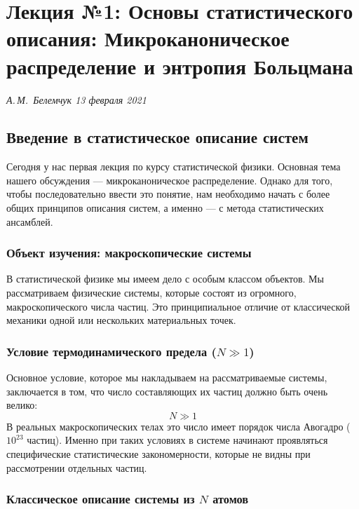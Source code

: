 \documentclass[../general/general]{subfiles}
\begin{document}
\chapter{Лекция №1: Основы статистического описания: Микроканоническое распределение и энтропия Больцмана}
\noindent\textit{А.\,М.~Белемчук \hfill 13 февраля 2021}
\vspace{1em}
\ifSubfilesClassLoaded{\tableofcontents\newpage}{}

\section{Введение в статистическое описание систем}

Сегодня у нас первая лекция по курсу статистической физики. Основная тема нашего обсуждения — микроканоническое распределение. Однако для того, чтобы последовательно ввести это понятие, нам необходимо начать с более общих принципов описания систем, а именно — с метода статистических ансамблей.

\subsection{Объект изучения: макроскопические системы}

В статистической физике мы имеем дело с особым классом объектов. Мы рассматриваем физические системы, которые состоят из огромного, макроскопического числа частиц. Это принципиальное отличие от классической механики одной или нескольких материальных точек.

\subsection{Условие термодинамического предела ($N \gg 1$)}

Основное условие, которое мы накладываем на рассматриваемые системы, заключается в том, что число составляющих их частиц должно быть очень велико:
\begin{equation}
    N \gg 1
\end{equation}
В реальных макроскопических телах это число имеет порядок числа Авогадро ($10^{23}$ частиц). Именно при таких условиях в системе начинают проявляться специфические статистические закономерности, которые не видны при рассмотрении отдельных частиц.

\subsection{Классическое описание системы из $N$ атомов}
\end{document}
